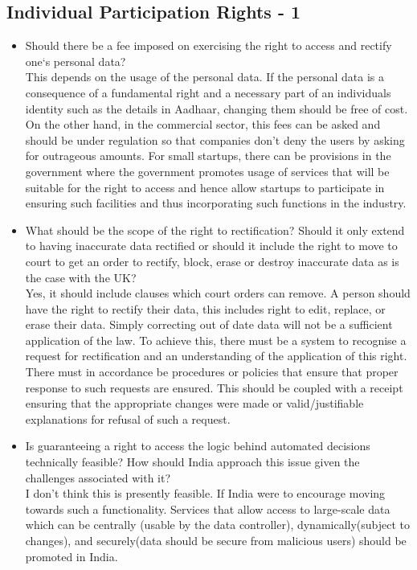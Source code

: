 \subsection{Individual Participation Rights - 1}
\begin{itemize}
	\item Should there be a fee imposed on exercising the right to access and rectify one‘s personal data?
	\\
	This depends on the usage of the personal data. If the personal data is a consequence of a fundamental right and a necessary part of an individuals identity such as the details in Aadhaar, changing them should be free of cost. On the other hand, in the commercial sector, this fees can be asked and should be under regulation so that companies don't deny the users by asking for outrageous amounts. For small startups, there can be provisions in the government where the government promotes usage of services that will be suitable for the right to access and hence allow startups to participate in ensuring such facilities and thus incorporating such functions in the industry.
	\item What should be the scope of the right to rectification? Should it only extend to having inaccurate data rectified or should it include the right to move to court to get an order to rectify, block, erase or destroy inaccurate data as is the case with the UK?
	\\
	Yes, it should include clauses which court orders can remove. A person should have the right to rectify their data, this includes right to edit, replace, or erase their data. Simply correcting out of date data will not be a sufficient application of the law. To achieve this, there must be a system to recognise a request for rectification and an understanding of the application of this right. There must in accordance be procedures or policies that ensure that proper response to such requests are ensured. This should be coupled with a receipt ensuring that the appropriate changes were made or valid/justifiable explanations for refusal of such a request.
	\item Is guaranteeing a right to access the logic behind automated decisions technically feasible? How should India approach this issue given the challenges associated with it?
	\\
	I don’t think this is presently feasible. If India were to encourage moving towards such a functionality. Services that allow access to large-scale data which can be centrally (usable by the data controller), dynamically(subject to changes), and securely(data should be secure from malicious users) should be promoted in India.
\end{itemize}
